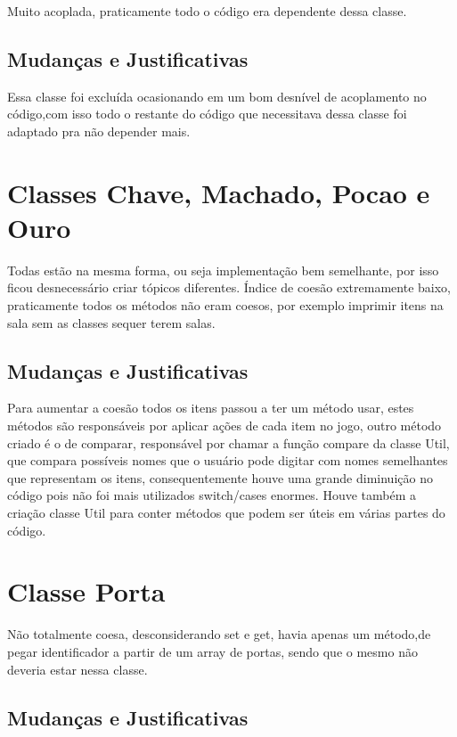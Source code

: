 \documentclass[runningheads,a4paper]{llncs}
\begin{document}
Muito acoplada, praticamente todo o código era dependente dessa classe.

\subsection{Mudanças e Justificativas}

Essa classe foi excluída ocasionando em um bom desnível de acoplamento no código,com isso todo o restante do código que necessitava dessa classe foi adaptado pra não depender mais. 

\section{Classes Chave, Machado, Pocao e Ouro}

Todas estão na mesma forma, ou seja implementação bem semelhante, por isso ficou desnecessário criar tópicos diferentes.
Índice de coesão extremamente baixo, praticamente todos os métodos não eram coesos, por exemplo imprimir itens na sala sem as classes sequer terem salas. 

\subsection{Mudanças e Justificativas}

Para aumentar a coesão todos os itens passou a ter um método usar, estes métodos são responsáveis por aplicar ações de cada item no jogo, outro método criado é o de comparar, responsável por chamar a função compare da classe Util, que compara possíveis nomes que o usuário pode digitar com nomes semelhantes que representam os itens, consequentemente houve uma grande diminuição no código pois não foi mais utilizados switch/cases enormes. Houve também a criação classe Util para conter métodos que podem ser úteis em várias partes do código.

\section{Classe Porta}

Não totalmente coesa, desconsiderando set e get, havia apenas um método,de pegar identificador a partir de um array de portas, sendo que o mesmo não deveria estar nessa classe.

\subsection{Mudanças e Justificativas}
\end{document}
